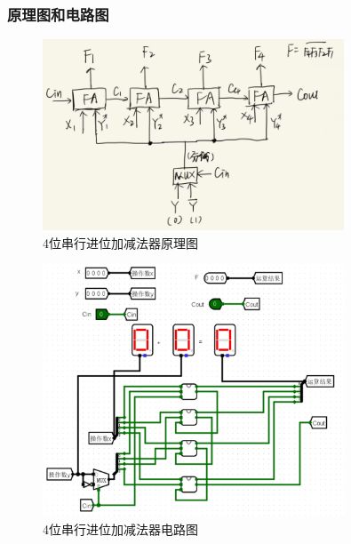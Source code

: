 \documentclass{article}
\begin{document}
    \subsubsection{原理图和电路图}
    \begin{figure}[H]
    \centering
    \includegraphics[width=0.8\textwidth]{4.4.1.png}
    \caption{4位串行进位加减法器原理图}
    \end{figure}

    \begin{figure}[H]
    \centering
    \includegraphics[width=0.8\textwidth]{4.4.2.png}
    \caption{4位串行进位加减法器电路图}
    \end{figure}
\end{document}

